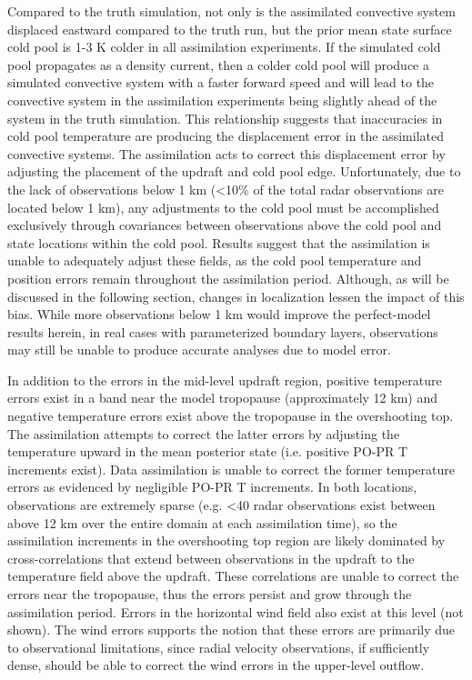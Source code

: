 Compared to the truth simulation, not only is the assimilated convective system displaced eastward compared to the truth run, but the prior mean state surface cold pool is 1-3 K colder in all assimilation experiments. If the simulated cold pool propagates as a density current, then a colder cold pool will produce a simulated convective system with a faster forward speed \citep{wakimoto82} and will lead to the convective system in the assimilation experiments being slightly ahead of the system in the truth simulation.  This relationship suggests that inaccuracies in cold pool temperature are producing the displacement error in the assimilated convective systems.  The assimilation acts to correct this displacement error by adjusting the placement of the updraft and cold pool edge.  Unfortunately, due to the lack of observations below 1 km (\textless 10\% of the total radar observations are located below 1 km), any adjustments to the cold pool must be accomplished exclusively through covariances between observations above the cold pool and state locations within the cold pool.  Results suggest that the assimilation is unable to adequately adjust these fields, as the cold pool temperature and position errors remain throughout the assimilation period. Although, as will be discussed in the following section, changes in localization lessen the impact of this bias. While more observations below 1 km would improve the perfect-model results herein, in real cases with parameterized boundary layers, observations may still be unable to produce accurate analyses due to model error.

In addition to the errors in the mid-level updraft region, positive temperature errors exist in a band near the model tropopause (approximately 12 km) and negative temperature errors exist above the tropopause in the overshooting top. The assimilation attempts to correct the latter errors by adjusting the temperature upward in the mean posterior state (i.e. positive PO-PR T increments exist). Data assimilation is unable to correct the former temperature errors as evidenced by negligible PO-PR T increments. In both locations, observations are extremely sparse (e.g. \textless 40 radar observations exist between above 12 km over the entire domain at each assimilation time), so the assimilation increments in the overshooting top region are likely dominated by cross-correlations that extend between observations in the updraft to the temperature field above the updraft. These correlations are unable to correct the errors near the tropopause, thus the errors persist and grow through the assimilation period. Errors in the horizontal wind field also exist at this level (not shown). The wind errors supports the notion that these errors are primarily due to observational limitations, since radial velocity observations, if sufficiently dense, should be able to correct the wind errors in the upper-level outflow.

